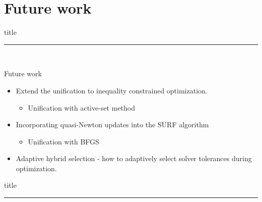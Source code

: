 \documentclass{beamer}
\begin{document}
\section{Future work}
    \begin{frame}[plain]
        \vfill
      \centering
      \begin{beamercolorbox}[sep=8pt,center,shadow=true,rounded=true]{title}
        \insertsectionhead\par%
        \color{oxfordblue}\noindent\rule{10cm}{1pt} \\
        \LARGE{\faFileTextO}
      \end{beamercolorbox}
      \vfill
  \end{frame}

  \begin{frame}{Future work}
    \vspace{-10mm}
    \begin{itemize}
      \item Extend the unification to inequality constrained optimization.
      \begin{itemize}
        \item Unification with active-set method
      \end{itemize} 
      \item Incorporating quasi-Newton updates into the SURF algorithm
      \begin{itemize}
        \item Unification with BFGS
      \end{itemize} 
      \item Adaptive hybrid selection - how to adaptively select solver tolerances during optimization.

    \end{itemize}
  \end{frame}

  
  \begin{frame}[plain]
      \vfill
    \centering
    \begin{beamercolorbox}[sep=8pt,center,shadow=true,rounded=true]{title}
      \par%
      \color{oxfordblue}\noindent\rule{10cm}{1pt} \\
      \LARGE{\faFileTextO}
    \end{beamercolorbox}
    \vfill
  \end{frame}
\end{document}
